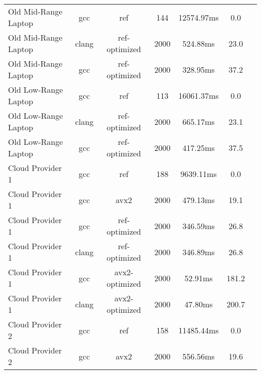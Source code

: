 \begin{table}
\begin{tabularx}{\linewidth}{X c c c c c c}
        Old Mid-Range Laptop &                  gcc &                  ref &                  144 &           12574.97ms &                  0.0\\
        Old Mid-Range Laptop &                clang &        ref-optimized &                 2000 &             524.88ms &                 23.0\\
        Old Mid-Range Laptop &                  gcc &        ref-optimized &                 2000 &             328.95ms &                 37.2\\
        Old Low-Range Laptop &                  gcc &                  ref &                  113 &           16061.37ms &                  0.0\\
        Old Low-Range Laptop &                clang &        ref-optimized &                 2000 &             665.17ms &                 23.1\\
        Old Low-Range Laptop &                  gcc &        ref-optimized &                 2000 &             417.25ms &                 37.5\\
            Cloud Provider 1 &                  gcc &                  ref &                  188 &            9639.11ms &                  0.0\\
            Cloud Provider 1 &                  gcc &                 avx2 &                 2000 &             479.13ms &                 19.1\\
            Cloud Provider 1 &                  gcc &        ref-optimized &                 2000 &             346.59ms &                 26.8\\
            Cloud Provider 1 &                clang &        ref-optimized &                 2000 &             346.89ms &                 26.8\\
            Cloud Provider 1 &                  gcc &       avx2-optimized &                 2000 &              52.91ms &                181.2\\
            Cloud Provider 1 &                clang &       avx2-optimized &                 2000 &              47.80ms &                200.7\\
            Cloud Provider 2 &                  gcc &                  ref &                  158 &           11485.44ms &                  0.0\\
            Cloud Provider 2 &                  gcc &                 avx2 &                 2000 &             556.56ms &                 19.6\\

\end{tabularx}
\end{table}

